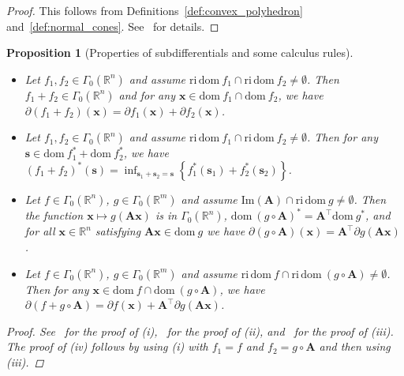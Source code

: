 \documentclass[11pt]{article}
\newtheorem{prop}{Proposition}[section]
\numberwithin{prop}{section}
\numberwithin{lem}{section}
\numberwithin{rem}{section}
\numberwithin{cor}{section}
\numberwithin{thm}{section}
\numberwithin{defn}{section}
\numberwithin{fact}{section}
\theoremstyle{plain}
\def\bs {\boldsymbol{s}}
\def\bx {\boldsymbol{x}}
\def\R {\mathbb{R}}
\newcommand{\matr}[1]{\bm{#1}}
\def\dom {\mathrm{dom~}}    %
\def\ri {\mathrm{ri}}      %
\def\Rn {\R^n}
\def\Rm {\R^m}
\def\gmRn {\Gamma_0(\Rn)}   %
\def\gmRm {\Gamma_0(\Rm)}
\newcommand{\image}[1]{\mathrm{Im}({#1})}
\begin{document}
\begin{proof}
This follows from Definitions~\ref{def:convex_polyhedron} and~\ref{def:normal_cones}. See~\cite[Example 5.2.6]{hiriart2013convexI} for details.
\end{proof}
%
\begin{prop}[Properties of subdifferentials and some calculus rules]\label{prop:precomposition}
\noindent
\begin{itemize}
    \item[(i)] Let $f_{1},f_{2} \in \gmRn$ and assume $\ri \, \dom f_{1} \cap \ri \, \dom f_{2} \neq \emptyset$. Then $f_{1} + f_{2} \in \gmRn$ and for any $\bx \in \dom f_{1} \cap \dom f_{2}$, we have $\partial(f_{1} + f_{2})(\bx) = \partial f_{1}(\bx) + \partial f_{2}(\bx)$.

    \item[(ii)] Let $f_{1},f_{2} \in \gmRn$ and assume $\ri \, \dom f_{1} \cap \ri \, \dom f_{2} \neq \emptyset$. Then for any $\bs \in \dom f_{1}^{*} + \dom f_{2}^{*}$, we have $(f_{1} + f_{2})^{*}(\bs) = \inf_{\bs_{1} + \bs_{2} = \bs}\left\{f_{1}^{*}(\bs_{1}) + f_{2}^{*}(\bs_{2})\right\}$.

    \item[(iii)] Let $f \in \gmRn$, $g \in \gmRm$ and assume $\image{\matr{A}} \cap \ri \, \dom g \neq \emptyset$. Then the function $\bx \mapsto g(\matr{A}\bx)$ is in $\gmRn$, $\dom(g \circ \matr{A})^{*} = \matr{A}^{\top}\dom g^{*}$, and for all $\bx \in \Rn$ satisfying $\matr{A}\bx \in \dom g$ we have $\partial(g \circ \matr{A})(\bx) = \matr{A}^{\top}\partial g(\matr{A}\bx)$.
    
    \item[(iv)] Let $f \in \gmRn$, $g \in \gmRm$ and assume $\ri \, \dom f \cap \ri \, \dom (g \circ \matr{A}) \neq \emptyset$. Then for any $\bx \in \dom f \cap \dom (g\circ\matr{A})$, we have $\partial(f + g\circ\matr{A}) = \partial f(\bx) + \matr{A}^{\top}\partial g(\matr{A}\bx)$.
\end{itemize}
\begin{proof}
See~\cite[Corollary 3.1.2]{hiriart2013convexII} for the proof of (i),~\cite[Theorem 2.3.3]{hiriart2013convexII} for the proof of (ii), and~\cite[Theorem 2.2.1, Theorem 2.2.3, and Theorem 3.2.1.]{hiriart2013convexII} for the proof of (iii). The proof of (iv) follows by using (i) with $f_{1} = f$ and $f_{2} = g \circ \matr{A}$ and then using (iii).
\end{proof}
\end{prop}
%
\end{document}
